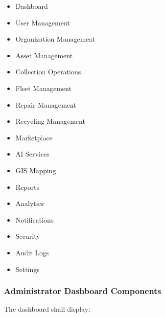\begin{itemize}

\item Dashboard

\item User Management

\item Organization Management

\item Asset Management

\item Collection Operations

\item Fleet Management

\item Repair Management

\item Recycling Management

\item Marketplace

\item AI Services

\item GIS Mapping

\item Reports

\item Analytics

\item Notifications

\item Security

\item Audit Logs

\item Settings

\end{itemize}


\subsubsection*{Administrator Dashboard Components}

The dashboard shall display:

